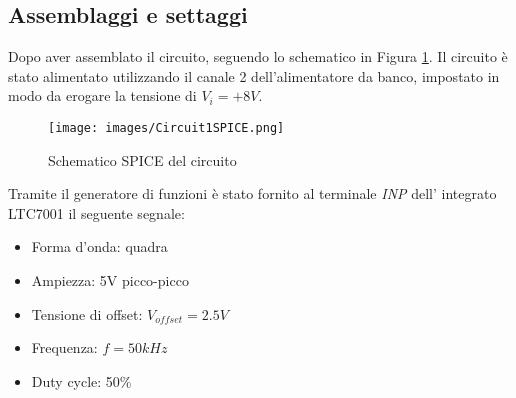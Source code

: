 \subsection{Assemblaggi e settaggi}
Dopo aver assemblato il circuito, seguendo lo schematico in Figura \ref{fig:Circuit1SPICE}. Il circuito è stato alimentato utilizzando il canale 2 dell'alimentatore da banco, impostato in modo da erogare la tensione di $V_i=+8V$.
\begin{figure}[H]
    \centering
    \texttt{[image: images/Circuit1SPICE.png]}
    \caption{Schematico SPICE del circuito}
    \label{fig:Circuit1SPICE}
\end{figure}
Tramite il generatore di funzioni è stato fornito al terminale \textit{INP} dell' integrato LTC7001 il seguente segnale:
\begin{itemize}
    \item Forma d'onda: quadra
    \item Ampiezza: 5V picco-picco
    \item Tensione di offset: $V_{offset}=2.5V$
    \item Frequenza: $f=50kHz$
    \item Duty cycle: 50\%
\end{itemize}
\clearpage
